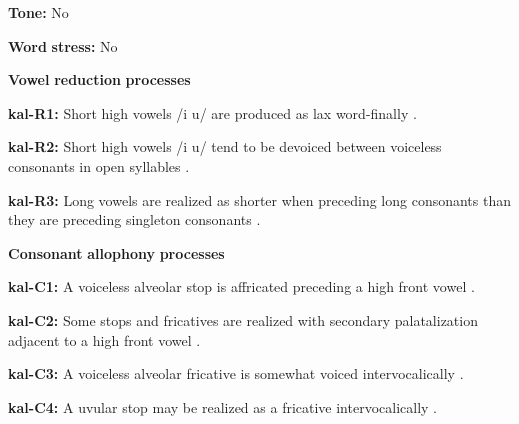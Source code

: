 \begin{styleBody}
\textbf{Tone:} No
\end{styleBody}

\begin{styleBody}
\textbf{Word} \textbf{stress:} No
\end{styleBody}

\begin{styleBody}
\textbf{Vowel} \textbf{reduction} \textbf{processes}
\end{styleBody}

\begin{styleBody}
\textbf{kal-R1:}  Short high vowels /i u/ are produced as lax word-finally \citep[56-63]{Hagerup2011}.
\end{styleBody}

\begin{styleBody}
\textbf{kal-R2:} Short high vowels /i u/ tend to be devoiced between voiceless consonants in open syllables \citep[335]{Fortescue1984}.
\end{styleBody}

\begin{styleBody}
\textbf{kal-R3:} Long vowels are realized as shorter when preceding long consonants than they are preceding singleton consonants \citep[65]{Jacobsen2000}.
\end{styleBody}

\begin{styleBody}
\textbf{Consonant} \textbf{allophony} \textbf{processes}
\end{styleBody}

\begin{styleBody}
\textbf{kal-C1:} A voiceless alveolar stop is affricated preceding a high front vowel \citep[333]{Fortescue1984}.
\end{styleBody}

\begin{styleBody}
\textbf{kal-C2:} Some stops and fricatives are realized with secondary palatalization adjacent to a high front vowel \citep[333]{Fortescue1984}.
\end{styleBody}

\begin{styleBody}
\textbf{kal-C3:} A voiceless alveolar fricative is somewhat voiced intervocalically \citep[334]{Fortescue1984}.
\end{styleBody}

\begin{styleBody}
\textbf{kal-C4:} A uvular stop may be realized as a fricative intervocalically \citep[333]{Fortescue1984}.
\end{styleBody}


